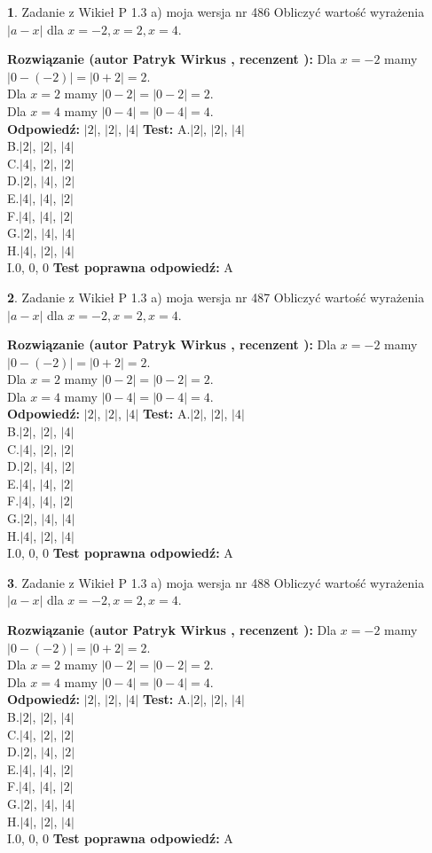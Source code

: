 \documentclass[12pt, a4paper]{article}
\theoremstyle{definition} %
\newtheorem{zad}{}
\newcommand{\zadStart}[1]{\begin{zad}#1\newline}
\newcommand{\zadStop}{\end{zad}}
\newcommand{\rozwStart}[2]{\noindent \textbf{Rozwiązanie (autor #1 , recenzent #2): }\newline}
\newcommand{\rozwStop}{\newline}
\newcommand{\odpStart}{\noindent \textbf{Odpowiedź:}\newline}
\newcommand{\odpStop}{\newline}
\newcommand{\testStart}{\noindent \textbf{Test:}\newline}
\newcommand{\testStop}{\newline}
\newcommand{\kluczStart}{\noindent \textbf{Test poprawna odpowiedź:}\newline}
\newcommand{\kluczStop}{\newline}
\begin{document}
\zadStart{Zadanie z Wikieł P 1.3 a) moja wersja nr 486}
Obliczyć wartość wyrażenia $|a - x|$ dla $x=-2,x=2,x=4$.
\zadStop
\rozwStart{Patryk Wirkus}{}
Dla $x = -2$ mamy $|0 - (-2)| = |0 + 2| = 2$.\\
Dla $x = 2$ mamy $|0 - 2| = |0 - 2| = 2$.\\
Dla $x = 4$ mamy $|0 - 4| = |0 - 4| = 4$.\\
\rozwStop
\odpStart
$|2|$, $|2|$, $|4|$
\odpStop
\testStart
A.$|2|$, $|2|$, $|4|$\\
B.$|2|$, $|2|$, $|4|$\\
C.$|4|$, $|2|$, $|2|$\\
D.$|2|$, $|4|$, $|2|$\\
E.$|4|$, $|4|$, $|2|$\\
F.$|4|$, $|4|$, $|2|$\\
G.$|2|$, $|4|$, $|4|$\\
H.$|4|$, $|2|$, $|4|$\\
I.$0$, $0$, $0$
\testStop
\kluczStart
A
\kluczStop



\zadStart{Zadanie z Wikieł P 1.3 a) moja wersja nr 487}
Obliczyć wartość wyrażenia $|a - x|$ dla $x=-2,x=2,x=4$.
\zadStop
\rozwStart{Patryk Wirkus}{}
Dla $x = -2$ mamy $|0 - (-2)| = |0 + 2| = 2$.\\
Dla $x = 2$ mamy $|0 - 2| = |0 - 2| = 2$.\\
Dla $x = 4$ mamy $|0 - 4| = |0 - 4| = 4$.\\
\rozwStop
\odpStart
$|2|$, $|2|$, $|4|$
\odpStop
\testStart
A.$|2|$, $|2|$, $|4|$\\
B.$|2|$, $|2|$, $|4|$\\
C.$|4|$, $|2|$, $|2|$\\
D.$|2|$, $|4|$, $|2|$\\
E.$|4|$, $|4|$, $|2|$\\
F.$|4|$, $|4|$, $|2|$\\
G.$|2|$, $|4|$, $|4|$\\
H.$|4|$, $|2|$, $|4|$\\
I.$0$, $0$, $0$
\testStop
\kluczStart
A
\kluczStop



\zadStart{Zadanie z Wikieł P 1.3 a) moja wersja nr 488}
Obliczyć wartość wyrażenia $|a - x|$ dla $x=-2,x=2,x=4$.
\zadStop
\rozwStart{Patryk Wirkus}{}
Dla $x = -2$ mamy $|0 - (-2)| = |0 + 2| = 2$.\\
Dla $x = 2$ mamy $|0 - 2| = |0 - 2| = 2$.\\
Dla $x = 4$ mamy $|0 - 4| = |0 - 4| = 4$.\\
\rozwStop
\odpStart
$|2|$, $|2|$, $|4|$
\odpStop
\testStart
A.$|2|$, $|2|$, $|4|$\\
B.$|2|$, $|2|$, $|4|$\\
C.$|4|$, $|2|$, $|2|$\\
D.$|2|$, $|4|$, $|2|$\\
E.$|4|$, $|4|$, $|2|$\\
F.$|4|$, $|4|$, $|2|$\\
G.$|2|$, $|4|$, $|4|$\\
H.$|4|$, $|2|$, $|4|$\\
I.$0$, $0$, $0$
\testStop
\kluczStart
A
\kluczStop
\end{document}
